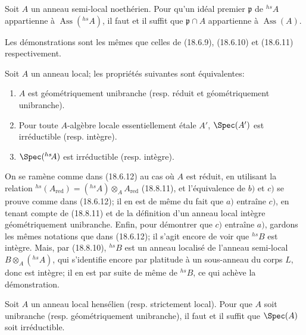 \begin{corollary}[18.8.14]
\label{IV.18.8.14}
Soit $A$ un anneau semi-local noethérien. Pour qu'un idéal premier $\mathfrak p$ de ${}^{hs}\!A$ appartienne à $\operatorname{Ass}({}^{hs}\!A)$, il faut et il suffit que $\mathfrak p\cap A$ appartienne à $\operatorname{Ass}(A)$.
\end{corollary}

Les démonstrations sont les mêmes que celles de (18.6.9), (18.6.10) et (18.6.11) respectivement.

\begin{proposition}[18.8.15]
\label{IV.18.8.15}
Soit $A$ un anneau local; les propriétés suivantes sont équivalentes:
\begin{enumerate}
  \item[$a)$] $A$ est géométriquement unibranche (resp. réduit et géométriquement unibranche).
  \item[$b)$] Pour toute $A$-algèbre locale essentiellement étale $A'$, $\Spec(A')$ est irréductible (resp. intègre).
  \item[$c)$] $\Spec({}^{hs}\!A)$ est irréductible (resp. intègre).
\end{enumerate}
\end{proposition}

On se ramène comme dans (18.6.12) au cas où $A$ est réduit, en utilisant la relation ${}^{hs}(A_{\mathrm{red}})=({}^{hs}\!A)\otimes_A A_{\mathrm{red}}$ (18.8.11), et l'équivalence de $b)$ et $c)$ se prouve comme dans (18.6.12); il en est de même du fait que $a)$ entraîne $c)$, en tenant compte de (18.8.11) et de la définition d'un anneau local intègre géométriquement unibranche. Enfin, pour démontrer que $c)$ entraîne $a)$, gardons les mêmes notations que dans (18.6.12); il s'agit encore de voir que ${}^{hs}\!B$ est intègre. Mais, par (18.8.10), ${}^{hs}\!B$ est un anneau localisé de l'anneau semi-local $B\otimes_A({}^{hs}\!A)$, qui s'identifie encore par platitude à un sous-anneau du corps $L$, donc est intègre; il en est par suite de même de ${}^{hs}\!B$, ce qui achève la démonstration.

\begin{corollary}[18.8.16]
\label{IV.18.8.16}
Soit $A$ un anneau local hensélien (resp. strictement local). Pour que $A$ soit unibranche (resp. géométriquement unibranche), il faut et il suffit que $\Spec(A)$ soit irréductible.
\end{corollary}

